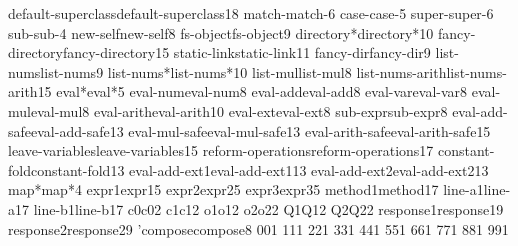 {    {default-superclass}{{{\color{ColorKw}default-superclass}}}{18}
    {match-}{{{\color{ColorKw}match-}}}{6}
    {case-}{{{\color{ColorKw}case-}}}{5}
    {super-}{{{\color{ColorId}super-}}}{6}
    {sub-}{{{\color{ColorId}sub-}}}{4}
    {new-self}{{{\color{ColorId}new-self}}}{8}
    {fs-object}{{{\color{ColorId}fs-object}}}{9}
    {directory*}{{{\color{ColorId}directory*}}}{10}
    {fancy-directory}{{{\color{ColorId}fancy-directory}}}{15}
    {static-link}{{{\color{ColorId}static-link}}}{11}
    {fancy-dir}{{{\color{ColorId}fancy-dir}}}{9}
    {list-nums}{{{\color{ColorId}list-nums}}}{9}
    {list-nums*}{{{\color{ColorId}list-nums*}}}{10}
    {list-mul}{{{\color{ColorId}list-mul}}}{8}
    {list-nums-arith}{{{\color{ColorId}list-nums-arith}}}{15}
    {eval*}{{{\color{ColorId}eval*}}}{5}
    {eval-num}{{{\color{ColorId}eval-num}}}{8}
    {eval-add}{{{\color{ColorId}eval-add}}}{8}
    {eval-var}{{{\color{ColorId}eval-var}}}{8}
    {eval-mul}{{{\color{ColorId}eval-mul}}}{8}
    {eval-arith}{{{\color{ColorId}eval-arith}}}{10}
    {eval-ext}{{{\color{ColorSym}eval-ext}}}{8}
    {sub-expr}{{{\color{ColorSym}sub-expr}}}{8}
    {eval-add-safe}{{{\color{ColorId}eval-add-safe}}}{13}
    {eval-mul-safe}{{{\color{ColorId}eval-mul-safe}}}{13}
    {eval-arith-safe}{{{\color{ColorId}eval-arith-safe}}}{15}
    {leave-variables}{{{\color{ColorId}leave-variables}}}{15}
    {reform-operations}{{{\color{ColorId}reform-operations}}}{17}
    {constant-fold}{{{\color{ColorId}constant-fold}}}{13}
    {eval-add-ext1}{{{\color{ColorId}eval-add-ext1}}}{13}
    {eval-add-ext2}{{{\color{ColorId}eval-add-ext2}}}{13}
    {map*}{{{\color{ColorId}map*}}}{4}
    {expr1}{{{\color{ColorId}expr1}}}{5}
    {expr2}{{{\color{ColorId}expr2}}}{5}
    {expr3}{{{\color{ColorId}expr3}}}{5}
    {method1}{{{\color{ColorSym}method1}}}{7}
    {line-a1}{{{\color{ColorSym}line-a1}}}{7}
    {line-b1}{{{\color{ColorSym}line-b1}}}{7}
    {c0}{{{\color{ColorId}c0}}}{2}
    {c1}{{{\color{ColorId}c1}}}{2}
    {o1}{{{\color{ColorId}o1}}}{2}
    {o2}{{{\color{ColorId}o2}}}{2}
    {Q1}{{{\color{ColorSym}Q1}}}{2}
    {Q2}{{{\color{ColorSym}Q2}}}{2}
    {response1}{{{\color{ColorSym}response1}}}{9}
    {response2}{{{\color{ColorSym}response2}}}{9}
    {'compose}{{{\color{ColorSym}\textquotesingle{}compose}}}{8}
    {0}{{{\color{ColorLit}0}}}{1}
    {1}{{{\color{ColorLit}1}}}{1}
    {2}{{{\color{ColorLit}2}}}{1}
    {3}{{{\color{ColorLit}3}}}{1}
    {4}{{{\color{ColorLit}4}}}{1}
    {5}{{{\color{ColorLit}5}}}{1}
    {6}{{{\color{ColorLit}6}}}{1}
    {7}{{{\color{ColorLit}7}}}{1}
    {8}{{{\color{ColorLit}8}}}{1}
    {9}{{{\color{ColorLit}9}}}{1}
}